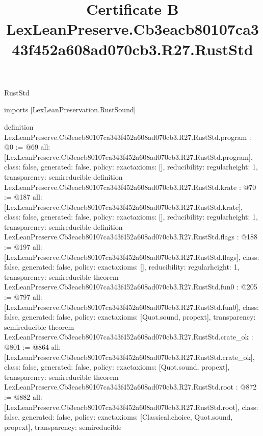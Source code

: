 \begin{lexlean}{RustStd}
\title{Certificate B LexLeanPreserve.Cb3eacb80107ca343f452a608ad070cb3.R27.RustStd}
\begin{coremodule}
imports [LexLeanPreservation.RustSound]

definition LexLeanPreserve.Cb3eacb80107ca343f452a608ad070cb3.R27.RustStd.program : @0 := @69 {
  all: [LexLeanPreserve.Cb3eacb80107ca343f452a608ad070cb3.R27.RustStd.program],
  class: false,
  generated: false,
  policy: exact{axioms: []},
  reducibility: regular{height: 1},
  transparency: semireducible
}
definition LexLeanPreserve.Cb3eacb80107ca343f452a608ad070cb3.R27.RustStd.krate : @70 := @187 {
  all: [LexLeanPreserve.Cb3eacb80107ca343f452a608ad070cb3.R27.RustStd.krate],
  class: false,
  generated: false,
  policy: exact{axioms: []},
  reducibility: regular{height: 1},
  transparency: semireducible
}
definition LexLeanPreserve.Cb3eacb80107ca343f452a608ad070cb3.R27.RustStd.flags : @188 := @197 {
  all: [LexLeanPreserve.Cb3eacb80107ca343f452a608ad070cb3.R27.RustStd.flags],
  class: false,
  generated: false,
  policy: exact{axioms: []},
  reducibility: regular{height: 1},
  transparency: semireducible
}
theorem LexLeanPreserve.Cb3eacb80107ca343f452a608ad070cb3.R27.RustStd.fun0 : @205 := @797 {
  all: [LexLeanPreserve.Cb3eacb80107ca343f452a608ad070cb3.R27.RustStd.fun0],
  class: false,
  generated: false,
  policy: exact{axioms: [Quot.sound, propext]},
  transparency: semireducible
}
theorem LexLeanPreserve.Cb3eacb80107ca343f452a608ad070cb3.R27.RustStd.crate_ok : @801 := @864 {
  all: [LexLeanPreserve.Cb3eacb80107ca343f452a608ad070cb3.R27.RustStd.crate_ok],
  class: false,
  generated: false,
  policy: exact{axioms: [Quot.sound, propext]},
  transparency: semireducible
}
theorem LexLeanPreserve.Cb3eacb80107ca343f452a608ad070cb3.R27.RustStd.root : @872 := @882 {
  all: [LexLeanPreserve.Cb3eacb80107ca343f452a608ad070cb3.R27.RustStd.root],
  class: false,
  generated: false,
  policy: exact{axioms: [Classical.choice, Quot.sound, propext]},
  transparency: semireducible
}


\end{coremodule}
\end{lexlean}
